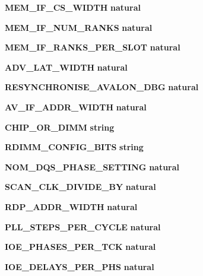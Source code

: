 \begin{DoxyCompactItemize}
{\bf M\+E\+M\+\_\+\+I\+F\+\_\+\+C\+S\+\_\+\+W\+I\+D\+TH} {\bfseries {\bfseries \textcolor{comment}{natural}\textcolor{vhdlchar}{ }}}
\item 
{\bf M\+E\+M\+\_\+\+I\+F\+\_\+\+N\+U\+M\+\_\+\+R\+A\+N\+KS} {\bfseries {\bfseries \textcolor{comment}{natural}\textcolor{vhdlchar}{ }}}
\item 
{\bf M\+E\+M\+\_\+\+I\+F\+\_\+\+R\+A\+N\+K\+S\+\_\+\+P\+E\+R\+\_\+\+S\+L\+OT} {\bfseries {\bfseries \textcolor{comment}{natural}\textcolor{vhdlchar}{ }}}
\item 
{\bf A\+D\+V\+\_\+\+L\+A\+T\+\_\+\+W\+I\+D\+TH} {\bfseries {\bfseries \textcolor{comment}{natural}\textcolor{vhdlchar}{ }}}
\item 
{\bf R\+E\+S\+Y\+N\+C\+H\+R\+O\+N\+I\+S\+E\+\_\+\+A\+V\+A\+L\+O\+N\+\_\+\+D\+BG} {\bfseries {\bfseries \textcolor{comment}{natural}\textcolor{vhdlchar}{ }}}
\item 
{\bf A\+V\+\_\+\+I\+F\+\_\+\+A\+D\+D\+R\+\_\+\+W\+I\+D\+TH} {\bfseries {\bfseries \textcolor{comment}{natural}\textcolor{vhdlchar}{ }}}
\item 
{\bf C\+H\+I\+P\+\_\+\+O\+R\+\_\+\+D\+I\+MM} {\bfseries {\bfseries \textcolor{comment}{string}\textcolor{vhdlchar}{ }}}
\item 
{\bf R\+D\+I\+M\+M\+\_\+\+C\+O\+N\+F\+I\+G\+\_\+\+B\+I\+TS} {\bfseries {\bfseries \textcolor{comment}{string}\textcolor{vhdlchar}{ }}}
\item 
{\bf N\+O\+M\+\_\+\+D\+Q\+S\+\_\+\+P\+H\+A\+S\+E\+\_\+\+S\+E\+T\+T\+I\+NG} {\bfseries {\bfseries \textcolor{comment}{natural}\textcolor{vhdlchar}{ }}}
\item 
{\bf S\+C\+A\+N\+\_\+\+C\+L\+K\+\_\+\+D\+I\+V\+I\+D\+E\+\_\+\+BY} {\bfseries {\bfseries \textcolor{comment}{natural}\textcolor{vhdlchar}{ }}}
\item 
{\bf R\+D\+P\+\_\+\+A\+D\+D\+R\+\_\+\+W\+I\+D\+TH} {\bfseries {\bfseries \textcolor{comment}{natural}\textcolor{vhdlchar}{ }}}
\item 
{\bf P\+L\+L\+\_\+\+S\+T\+E\+P\+S\+\_\+\+P\+E\+R\+\_\+\+C\+Y\+C\+LE} {\bfseries {\bfseries \textcolor{comment}{natural}\textcolor{vhdlchar}{ }}}
\item 
{\bf I\+O\+E\+\_\+\+P\+H\+A\+S\+E\+S\+\_\+\+P\+E\+R\+\_\+\+T\+CK} {\bfseries {\bfseries \textcolor{comment}{natural}\textcolor{vhdlchar}{ }}}
\item 
{\bf I\+O\+E\+\_\+\+D\+E\+L\+A\+Y\+S\+\_\+\+P\+E\+R\+\_\+\+P\+HS} {\bfseries {\bfseries \textcolor{comment}{natural}\textcolor{vhdlchar}{ }}}
\item 

\end{DoxyCompactItemize}
